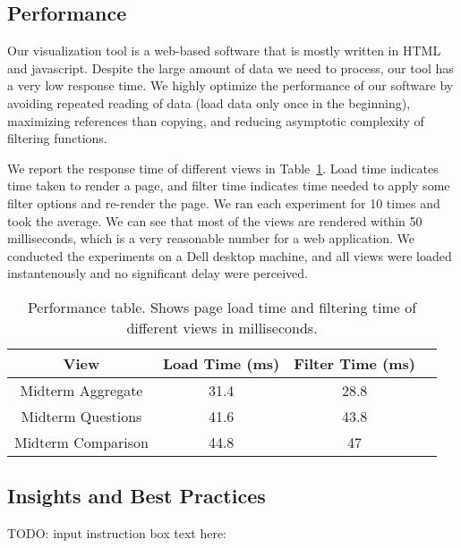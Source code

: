 \subsection{Performance}
Our visualization tool is a web-based software that is mostly written in HTML and javascript. Despite the large amount of data we need to process, our tool has a very low response time. We highly optimize the performance of our software by avoiding repeated reading of data (load data only once in the beginning), maximizing references than copying, and reducing asymptotic complexity of filtering functions.

We report the response time of different views in Table~\ref{tab:performance}. Load time indicates time taken to render a page, and filter time indicates time needed to apply some filter options and re-render the page. We ran each experiment for 10 times and took the average. We can see that most of the views are rendered within 50 milliseconds, which is a very reasonable number for a web application. We conducted the experiments on a Dell desktop machine, and all views were loaded instantenously and no significant delay were perceived.

\begin{table}
\begin{tabular}{ | c | c | c | c |}
  \hline
  View & Load Time (ms) & Filter Time (ms) \\ \hline
  Midterm Aggregate & 31.4 & 28.8 \\ \hline
  Midterm Questions & 41.6 & 43.8 \\ \hline
  Midterm Comparison & 44.8 & 47 \\ \hline
\end{tabular}
\caption{Performance table. Shows page load time and filtering time of different views in milliseconds.}
\label{tab:performance}
\end{table}

\subsection{Insights and Best Practices}
 TODO: input instruction box text here: